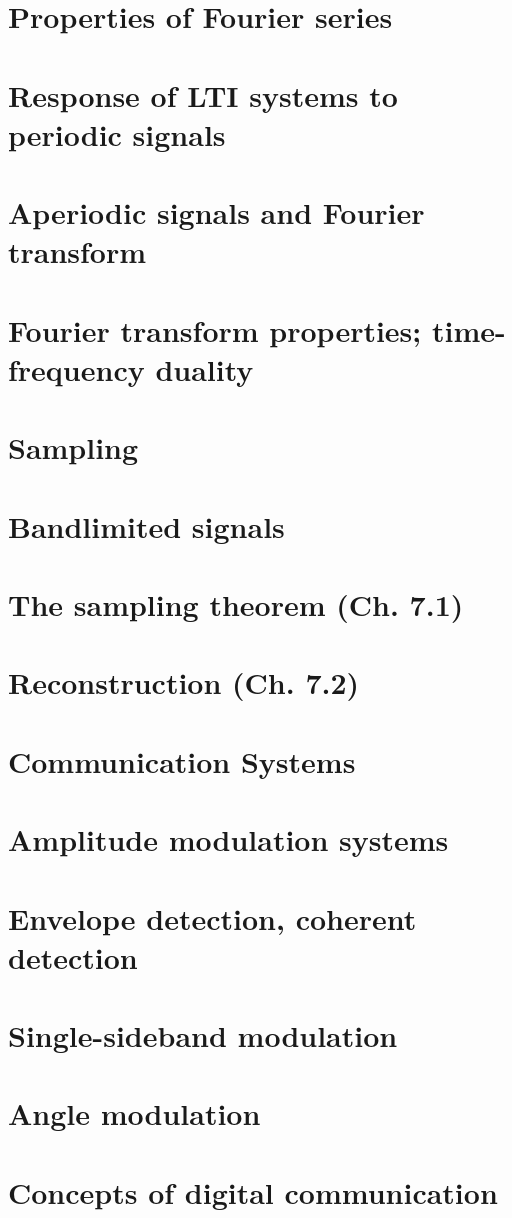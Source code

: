\documentclass{article}
\begin{document}
\section{Properties of Fourier series}
\section{Response of LTI systems to periodic signals}
\section{Aperiodic signals and Fourier transform}
\section{Fourier transform properties; time-frequency duality}

\section*{Sampling}
\section{Bandlimited signals}
\section{The sampling theorem (Ch. 7.1)}
\section{Reconstruction (Ch. 7.2)}

\section*{Communication Systems}
\section{Amplitude modulation systems}
\section{Envelope detection, coherent detection}
\section{Single-sideband modulation}
\section{Angle modulation}
\section{Concepts of digital communication}
\end{document}
